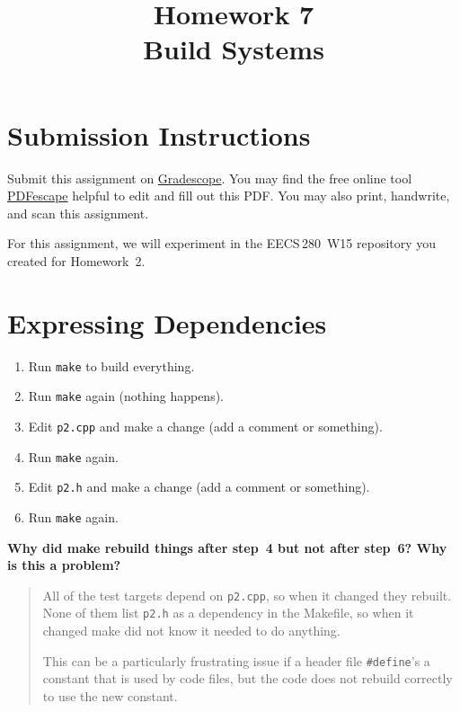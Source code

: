 \documentclass{article}
\begin{document}
\fancyhead[L]{}
\fancyhead[R]{}

\fancyfoot[C]{\color{gray} \thepage~/~\pageref*{LastPage}}
\pagestyle{fancyplain}


\title{\textbf{Homework 7\\Build Systems}}
\date{}
\maketitle

\section*{Submission Instructions}
Submit this assignment on \href{https://gradescope.com/courses/}{Gradescope}.
You may find the free online tool \href{https://www.pdfescape.com}{PDFescape}
helpful to edit and fill out this PDF.
You may also print, handwrite, and scan this assignment.



\newpage
\begin{mdframed}\centering
For this assignment, we will experiment in the EECS\,280~W15 repository you
created for Homework~2.
\end{mdframed}

\section{Expressing Dependencies}
\begin{enumerate}\small
  \item Run \texttt{make} to build everything.
  \item Run \texttt{make} again (nothing happens).
  \item Edit \texttt{p2.cpp} and make a change (add a comment or something).
  \item Run \texttt{make} again.
  \item Edit \texttt{p2.h} and make a change (add a comment or something).
  \item Run \texttt{make} again.
\end{enumerate}

\textbf{Why did make rebuild things after step~4 but not after step~6? Why is
this a problem?}
\begin{quote}
  \color{violet}
  All of the test targets depend on \texttt{p2.cpp}, so when it changed they
  rebuilt. None of them list \texttt{p2.h} as a dependency in the Makefile, so
  when it changed make did not know it needed to do anything.

  This can be a particularly frustrating issue if a header file
  \texttt{\#define}'s a constant that is used by code files, but the code does
  not rebuild correctly to use the new constant.
\end{quote}
\end{document}
